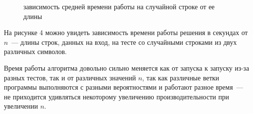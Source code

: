 \begin{figure}[h]
\caption{зависимость средней времени работы на случайной строке от ее длины}
\end{figure}

На рисунке 4 можно увидеть зависимость времени работы решения в секундах от $n$~--- длины строк, данных на вход, на тесте со случайными строками из двух различных символов.

Время работы алгоритма довольно сильно меняется как от запуска к запуску из-за разных тестов, так и от различных значений $n$, так как различные ветки программы выполняются с разными вероятностями и работают разное время~--- не приходится удивляться некоторому увеличению производительности при увеличении $n$.
